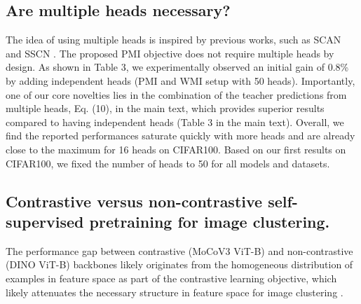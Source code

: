 \documentclass{bmvc2k}
\begin{document}
\subsection{Are multiple heads necessary?}
The idea of using multiple heads is inspired by previous works, such as SCAN \cite{scan} and SSCN \cite{sscn}. The proposed PMI objective does not require multiple heads by design. As shown in Table 3, we experimentally observed an initial gain of 0.8\% by adding independent heads (PMI and WMI setup with 50 heads). Importantly, one of our core novelties lies in the combination of the teacher predictions from multiple heads, Eq. (10), in the main text, which provides superior results compared to having independent heads (Table 3 in the main text).  Overall, we find the reported performances saturate quickly with more heads and are already close to the maximum for 16 heads on CIFAR100. Based on our first results on CIFAR100, we fixed the number of heads to 50 for all models and datasets.


\subsection{Contrastive versus non-contrastive self-supervised pretraining for image clustering.}
The performance gap between contrastive (MoCoV3 ViT-B) and non-contrastive (DINO ViT-B) backbones likely originates from the homogeneous distribution of examples in feature space as part of the contrastive learning objective, which likely attenuates the necessary structure in feature space for image clustering \cite{wang2020understanding,propos}.
\end{document}

